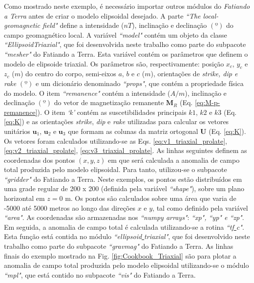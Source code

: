Como mostrado neste exemplo, é necessário importar outros módulos do \textit{Fatiando a Terra} antes de criar o modelo elipsoidal desejado.
A parte \textit{``The local-geomagnetic field"} define a intensidade ($nT$), inclinação e declinação $(º)$ do campo geomagnético local.
A variável \textit{``model"} contém um objeto da classe \textit{``EllipsoidTriaxial"}, que foi desenvolvida neste trabalho como parte do subpacote \textit{``mesher"} do Fatiando a Terra. Esta variável contém os parâmetros que definem o modelo de elipsoide triaxial. Os parâmetros são, respectivamente: posição $x_c$, $y_c$ e $z_c$ ($m$) do centro do corpo, semi-eixos $a$, $b$ e $c$ ($m$), orientações de \textit{strike, dip e rake} $(º)$ e um dicionário denominado \textit{``props"}, que contém a propriedade física do  modelo. O item \textit{``remanence"} contém a intensidade ($A/m$), inclinação e declinação $(º)$ do vetor de magnetização remanente $\mathbf{M}_{R}$ (Eq. \ref{eq:M-p-remanence}). O item \textit{`k'} contém as suscetibilidades principais $k1$, $k2$ e $k3$ (Eq. \ref{eq:K}) e as orientações \textit{strike}, \textit{dip} e \textit{rake} utilizadas para calcular os vetores unitários $\mathbf{u}_{1}$, $\mathbf{u}_{2}$ e $\mathbf{u}_{3}$ que formam as colunas da matriz ortogonal $\mathbf{U}$ (Eq. \ref{eq:K}). Os vetores foram calculados utilizando-se as Eqs. \ref{eq:v1_triaxial_prolate},
\ref{eq:v2_triaxial_prolate}, \ref{eq:v3_triaxial_prolate}.
As linhas seguintes definem as coordenadas dos pontos $(x, y, z)$ em que será calculada a anomalia de campo total produzida pelo modelo elipsoidal.
Para tanto, utilizou-se o subpacote \textit{``gridder"} do Fatiando a Terra. Neste exemplos, os pontos estão distribuídos em uma grade regular de 200 x 200 (definida pela variável \textit{``shape"}), sobre um plano horizontal em $z = 0$ m. Os pontos são calculados sobre uma área que varia de -5000 até 5000 metros ao longo das direções $x$ e $y$, tal como definido pela variável \textit{``area"}.
As coordenadas são armazenadas nos \textit{``numpy arrays"}: \textit{``xp", ``yp" e ``zp"}. Em seguida, a anomalia de campo total é calculada utilizando-se a rotina \textit{``tf\underline{ }c"}. Esta função está contida no módulo \textit{``ellipsoid\underline{ }triaxial"}, que foi desenvolvido neste trabalho como parte do subpacote \textit{``gravmag"} do Fatiando a Terra. As linhas finais do exemplo mostrado na Fig. \ref{fig:Cookbook_Triaxial} são para plotar a anomalia de campo total produzida pelo modelo elipsoidal utilizando-se o módulo \textit{``mpl"}, que está contido no subpacote \textit{``vis"} do Fatiando a Terra.

